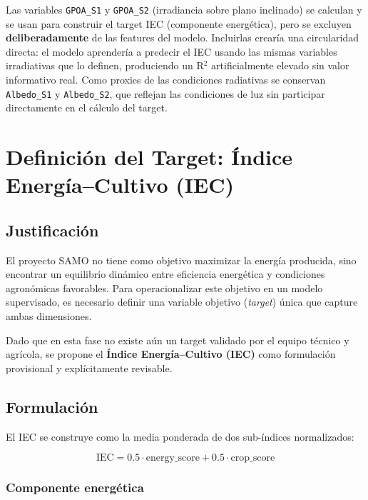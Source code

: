 \documentclass[12pt,a4paper]{article}
\begin{document}
Las variables \texttt{GPOA\_S1} y \texttt{GPOA\_S2} (irradiancia sobre plano inclinado)
se calculan y se usan para construir el target IEC (componente energética), pero se
excluyen \textbf{deliberadamente} de las features del modelo. Incluirlas crearía una
circularidad directa: el modelo aprendería a predecir el IEC usando las mismas variables
irradiativas que lo definen, produciendo un R$^2$ artificialmente elevado sin valor
informativo real. Como proxies de las condiciones radiativas se conservan
\texttt{Albedo\_S1} y \texttt{Albedo\_S2}, que reflejan las condiciones de luz sin
participar directamente en el cálculo del target.

\newpage
\section{Definición del Target: Índice Energía--Cultivo (IEC)}

\subsection{Justificación}

El proyecto SAMO no tiene como objetivo maximizar la energía producida, sino encontrar
un equilibrio dinámico entre eficiencia energética y condiciones agronómicas favorables.
Para operacionalizar este objetivo en un modelo supervisado, es necesario definir una
variable objetivo (\textit{target}) única que capture ambas dimensiones.

Dado que en esta fase no existe aún un target validado por el equipo técnico y agrícola,
se propone el \textbf{Índice Energía--Cultivo (IEC)} como formulación provisional y
explícitamente revisable.

\subsection{Formulación}

El IEC se construye como la media ponderada de dos sub-índices normalizados:

\begin{equation}
    \text{IEC} = 0.5 \cdot \text{energy\_score} + 0.5 \cdot \text{crop\_score}
    \label{eq:iec}
\end{equation}

\subsubsection{Componente energética}
\end{document}
